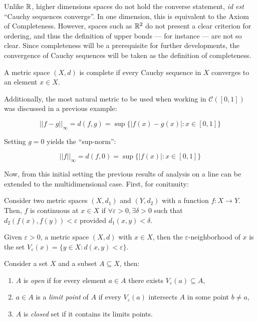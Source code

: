 Unlike $\mathbb{R}$, higher dimensions spaces do not hold the converse statement, \textit{id est} ``Cauchy sequences converge''. In one dimension, this is equivalent to the Axiom of Completeness. However, spaces such as $\mathbb{R}^2$ do not present a clear criterion for ordering, and thus the definition of upper bonds — for instance — are not so clear. Since completeness will be a prerequisite for further developments, the convergence of Cauchy sequences will be taken as the definition of completeness.

\begin{definition}[Completeness]
    A metric space $(X, d)$ is complete if every Cauchy sequence in $X$ converges to an element $x \in X$.
\end{definition}

Additionally, the most natural metric to be used when working in $\mathcal{C}([0,1])$ was discussed in a previous example:

\begin{equation*}
    ||f - g||_\infty  = d(f,g) = \sup \{ |f(x) - g(x)|:x \in [0,1] \}
\end{equation*}

Setting $g = 0$ yields the ``sup-norm'':

\begin{equation*}
    ||f||_\infty = d(f, 0) = \sup \{ |f(x)|:x \in [0,1] \} 
\end{equation*}

Now, from this initial setting the previous results of analysis on a line can be extended to the multidimensional case. First, for conitnuity:

\begin{definition}
    Consider two metric spaces $(X, d_1)$ and $(Y, d_2)$ with a function $f: X \to Y$. Then, $f$ is continuous at $x \in X$ if $\forall \varepsilon > 0, \exists \delta > 0$ such that $d_2(f(x), f(y)) < \varepsilon$ provided $d_1(x, y) < \delta$.
\end{definition}

\begin{definition}
    Given $\varepsilon > 0$, a metric space $(X,d)$ with $x \in X$, then the $\varepsilon$-neighborhood of $x$ is the set $V_\varepsilon (x) = \{ y \in X : d(x, y) < \varepsilon\}$.
\end{definition}

\begin{definition}
    Consider a set $X$ and a subset $A \subseteq X$, then:
    \begin{enumerate}
        \item $A$ is \emph{open} if for every element $a \in A$ there exists $V_\varepsilon(a) \subseteq A$,
        \item $a \in A$ is a \emph{limit point} of $A$ if every $V_\varepsilon(a)$ intersects $A$ in some point $b \neq a$,
        \item $A$ is \emph{closed} set if it contains its limits points.
    \end{enumerate}
\end{definition}